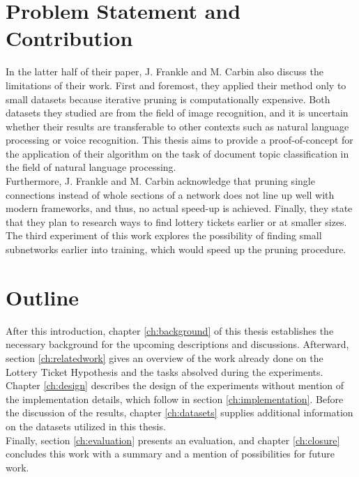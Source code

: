 \section{Problem Statement and Contribution}
In the latter half of their paper, J. Frankle and M. Carbin also discuss the limitations of their work. First and foremost, they applied their method only to small datasets because iterative pruning is computationally expensive.\cite{LTH} Both datasets they studied are from the field of image recognition, and it is uncertain whether their results are transferable to other contexts such as natural language processing or voice recognition. This thesis aims to provide a proof-of-concept for the application of their algorithm on the task of document topic classification in the field of natural language processing.\\
Furthermore, J. Frankle and M. Carbin acknowledge that pruning single connections instead of whole sections of a network does not line up well with modern frameworks, and thus, no actual speed-up is achieved. Finally, they state that they plan to research ways to find lottery tickets earlier or at smaller sizes.\cite{LTH} The third experiment of this work explores the possibility of finding small subnetworks earlier into training, which would speed up the pruning procedure.


\section{Outline}

After this introduction, chapter \ref{ch:background} of this thesis establishes the necessary background for the upcoming descriptions and discussions. Afterward, section \ref{ch:relatedwork} gives an overview of the work already done on the Lottery Ticket Hypothesis and the tasks absolved during the experiments. Chapter \ref{ch:design} describes the design of the experiments without mention of the implementation details, which follow in section \ref{ch:implementation}. Before the discussion of the results, chapter \ref{ch:datasets} supplies additional information on the datasets utilized in this thesis.\\
Finally, section \ref{ch:evaluation} presents an evaluation, and chapter \ref{ch:closure} concludes this work with a summary and a mention of possibilities for future work.